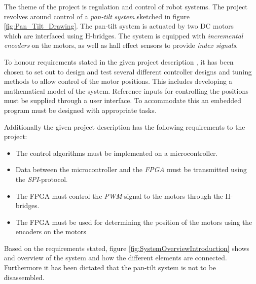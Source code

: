 \documentclass[../../main.tex]{subfiles}
\begin{document}
The theme of the project is regulation and control of robot systems. The project revolves around control of a \textit{pan-tilt system} sketched in figure \ref{fig:Pan_Tilt_Drawing}. 
The pan-tilt system is actuated by two DC motors which are interfaced using H-bridges. The system is equipped with \textit{incremental encoders} on the motors, as well as hall effect sensors to provide \textit{index signals}.

To honour requirements stated in the given project description \cite{christoffersloth}, it has been chosen to set out to design and test several different controller designs and tuning methods to allow control of the motor positions. This includes developing a mathematical model of the system. Reference inputs for controlling the positions must be supplied through a user interface. To accommodate this an embedded program must be designed with appropriate tasks.

Additionally the given project description has the following requirements to the project:

\begin{itemize}
    \item The control algorithms must be implemented on a microcontroller.
    \item Data between the microcontroller and the \textit{FPGA} must be transmitted using the \textit{SPI}-protocol. 
    \item The FPGA must control the \textit{PWM}-signal to the motors through the H-bridges.
    \item The FPGA must be used for determining the position of the motors using the encoders on the motors
\end{itemize}

Based on the requirements stated, figure \ref{fig:SystemOverviewIntroduction} shows and overview of the system and how the different elements are connected. Furthermore it has been dictated that the pan-tilt system is not to be disassembled.  


\end{document}
